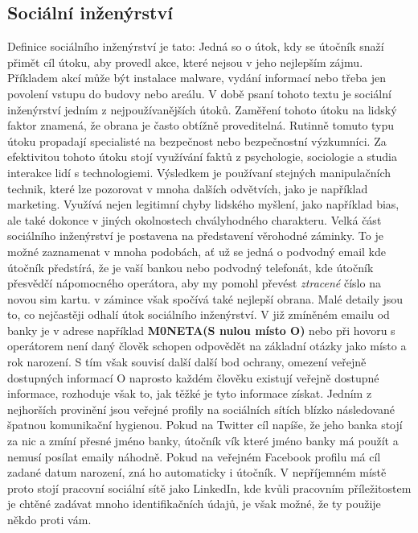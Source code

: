\subsection{Sociální inženýrství}\label{subsec:socialni-inzenyrstvi}
Definice sociálního inženýrství je tato:
Jedná so o útok, kdy se útočník snaží přimět cíl útoku, aby provedl akce, které nejsou v jeho nejlepším zájmu.
Příkladem akcí může být instalace malware, vydání informací nebo třeba jen povolení vstupu do budovy nebo areálu.
V době psaní tohoto textu je sociální inženýrství jedním z nejpoužívanějších útoků.
Zaměření tohoto útoku na lidský faktor znamená, že obrana je často obtížně proveditelná.
Rutinně tomuto typu útoku propadají specialisté na bezpečnost nebo bezpečnostní výzkumníci.
Za efektivitou tohoto útoku stojí využívání faktů z psychologie, sociologie a studia interakce lidí s technologiemi.
Výsledkem je používaní stejných manipulačních technik, které lze pozorovat v mnoha dalších odvětvích, jako je například marketing.
Využívá nejen legitimní chyby lidského myšlení, jako například bias, ale také dokonce v jiných okolnostech chvályhodného charakteru.
Velká část sociálního inženýrství je postavena na představení věrohodné záminky.
To je možné zaznamenat v mnoha podobách, ať už se jedná o podvodný email kde útočník předstírá, že je vaší bankou nebo podvodný telefonát, kde útočník přesvědčí nápomocného operátora, aby my pomohl převést \textit{ztracené} číslo na novou sim kartu.
v zámince však spočívá také nejlepší obrana.
Malé detaily jsou to, co nejčastěji odhalí útok sociálního inženýrství.
V již zmíněném emailu od banky je v adrese například \textbf{M0NETA(S nulou místo O)} nebo při hovoru s operátorem není daný člověk schopen odpovědět na základní otázky jako místo a rok narození.
S tím však souvisí další další bod ochrany, omezení veřejně dostupných informací
O naprosto každém člověku existují veřejně dostupné informace, rozhoduje však to, jak těžké je tyto informace získat.
Jedním z nejhorších provinění jsou veřejné profily na sociálních sítích blízko následované špatnou komunikační hygienou.
Pokud na Twitter cíl napíše, že jeho banka stojí za nic a zmíní přesné jméno banky, útočník vík které jméno banky má použít a nemusí posílat emaily náhodně.
Pokud na veřejném Facebook profilu má cíl zadané datum narození, zná ho automaticky i útočník.
V nepříjemném místě proto stojí pracovní sociální sítě jako LinkedIn, kde kvůli pracovním příležitostem je chtěné zadávat mnoho identifikačních údajů, je však možné, že ty použije někdo proti vám.\cite{moje_bakalarka}


